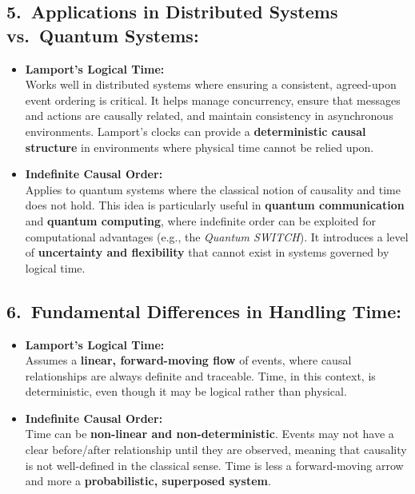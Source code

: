 \documentclass[../../../OAE-SPEC-MAIN.tex]{subfiles}
\begin{document}
\subsection*{5.\ Applications in Distributed Systems vs.\ Quantum Systems:}

\begin{itemize}[leftmargin=1.5em]
\item \textbf{Lamport’s Logical Time:}\\
  Works well in distributed systems where ensuring a consistent, agreed-upon event ordering is critical. It helps manage concurrency, ensure that messages and actions are causally related, and maintain consistency in asynchronous environments. Lamport’s clocks can provide a \textbf{deterministic causal structure} in environments where physical time cannot be relied upon.
\item \textbf{Indefinite Causal Order:}\\
  Applies to quantum systems where the classical notion of causality and time does not hold. This idea is particularly useful in \textbf{quantum communication} and \textbf{quantum computing}, where indefinite order can be exploited for computational advantages (e.g., the \emph{Quantum SWITCH}). It introduces a level of \textbf{uncertainty and flexibility} that cannot exist in systems governed by logical time.
\end{itemize}

\subsection*{6.\ Fundamental Differences in Handling Time:}

\begin{itemize}[leftmargin=1.5em]
\item \textbf{Lamport’s Logical Time:}\\
  Assumes a \textbf{linear, forward-moving flow} of events, where causal relationships are always definite and traceable. Time, in this context, is deterministic, even though it may be logical rather than physical.
\item \textbf{Indefinite Causal Order:}\\
  Time can be \textbf{non-linear and non-deterministic}. Events may not have a clear before/after relationship until they are observed, meaning that causality is not well-defined in the classical sense. Time is less a forward-moving arrow and more a \textbf{probabilistic, superposed system}.
\end{itemize}
\end{document}
